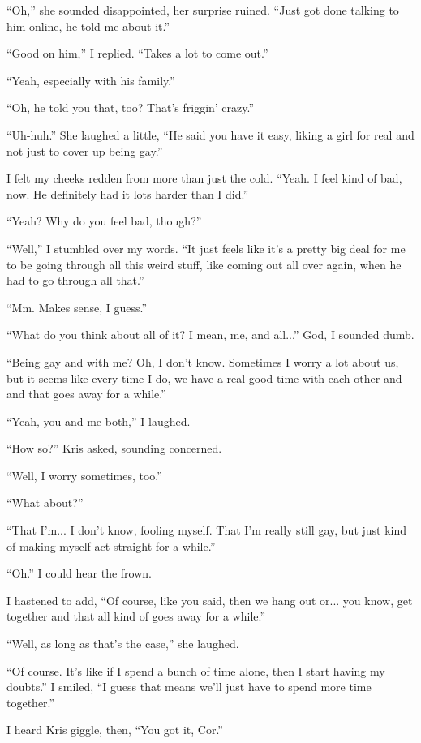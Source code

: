``Oh,'' she sounded disappointed, her surprise ruined.  ``Just got done talking to him online, he told me about it.''

``Good on him,'' I replied.  ``Takes a lot to come out.''

``Yeah, especially with his family.''

``Oh, he told you that, too?  That's friggin' crazy.''

``Uh-huh.''  She laughed a little, ``He said you have it easy, liking a girl for real and not just to cover up being gay.''

I felt my cheeks redden from more than just the cold.  ``Yeah.  I feel kind of bad, now.  He definitely had it lots harder than I did.''

``Yeah?  Why do you feel bad, though?''

``Well,'' I stumbled over my words.  ``It just feels like it's a pretty big deal for me to be going through all this weird stuff, like coming out all over again, when he had to go through all that.''

``Mm.  Makes sense, I guess.''

``What do you think about all of it?  I mean, me, and all...'' God, I sounded dumb.

``Being gay and with me?  Oh, I don't know.  Sometimes I worry a lot about us, but it seems like every time I do, we have a real good time with each other and and that goes away for a while.''

``Yeah, you and me both,'' I laughed.

``How so?'' Kris asked, sounding concerned.

``Well, I worry sometimes, too.''

``What about?''

``That I'm... I don't know, fooling myself.  That I'm really still gay, but just kind of making myself act straight for a while.''

``Oh.''  I could hear the frown.

I hastened to add, ``Of course, like you said, then we hang out or... you know, get together and that all kind of goes away for a while.''

``Well, as long as that's the case,'' she laughed.

``Of course.  It's like if I spend a bunch of time alone, then I start having my doubts.''  I smiled, ``I guess that means we'll just have to spend more time together.''

I heard Kris giggle, then, ``You got it, Cor.''

